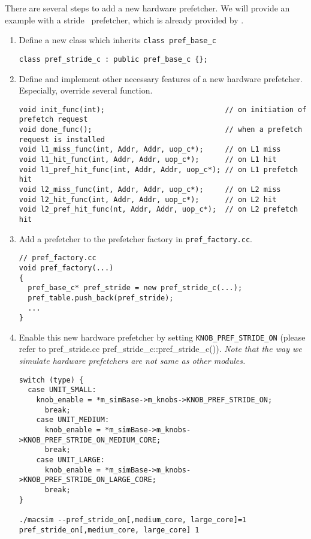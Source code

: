 There are several steps to add a new hardware prefetcher. We will provide
an example with a stride~\cite{iac:spr04} prefetcher, which is already
provided by \SIM.

\begin{enumerate}[Step 1.]
  \item Define a new class which inherits \Verb+class pref_base_c+
\begin{Verbatim}
class pref_stride_c : public pref_base_c {};
\end{Verbatim}

  \item Define and implement other necessary features of a new
    hardware prefetcher. Especially, override several function.
\begin{Verbatim}
void init_func(int);                            // on initiation of prefetch request
void done_func();                               // when a prefetch request is installed
void l1_miss_func(int, Addr, Addr, uop_c*);     // on L1 miss
void l1_hit_func(int, Addr, Addr, uop_c*);      // on L1 hit
void l1_pref_hit_func(int, Addr, Addr, uop_c*); // on L1 prefetch hit
void l2_miss_func(int, Addr, Addr, uop_c*);     // on L2 miss
void l2_hit_func(int, Addr, Addr, uop_c*);      // on L2 hit
void l2_pref_hit_func(nt, Addr, Addr, uop_c*);  // on L2 prefetch hit
\end{Verbatim}

  \item Add a prefetcher to the prefetcher factory in \Verb+pref_factory.cc+.

\begin{Verbatim}
// pref_factory.cc
void pref_factory(...)
{
  pref_base_c* pref_stride = new pref_stride_c(...);
  pref_table.push_back(pref_stride);
  ...
}
\end{Verbatim}

  \item Enable this new hardware prefetcher by setting
    \Verb+KNOB_PREF_STRIDE_ON+ (please refer to pref\_stride.cc
    pref\_stride\_c::pref\_stride\_c()). \textit{Note that the way we
      simulate hardware prefetchers are not same as other modules.}
\begin{Verbatim}
switch (type) {
  case UNIT_SMALL:
    knob_enable = *m_simBase->m_knobs->KNOB_PREF_STRIDE_ON;
      break;
    case UNIT_MEDIUM:
      knob_enable = *m_simBase->m_knobs->KNOB_PREF_STRIDE_ON_MEDIUM_CORE;
      break;
    case UNIT_LARGE:
      knob_enable = *m_simBase->m_knobs->KNOB_PREF_STRIDE_ON_LARGE_CORE;
      break;
}

./macsim --pref_stride_on[,medium_core, large_core]=1
pref_stride_on[,medium_core, large_core] 1
\end{Verbatim}
\end{enumerate}
